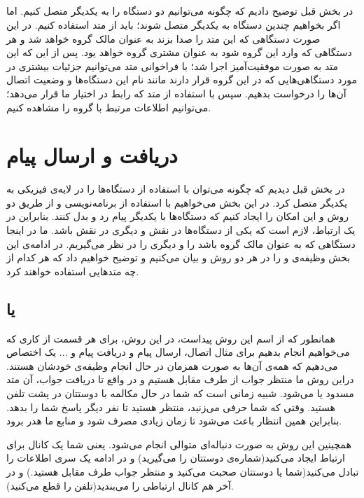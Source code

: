 \subsection{}
در بخش قبل توضیح دادیم که چگونه می‌توانیم دو دستگاه را به یکدیگر متصل کنیم. اما اگر بخواهیم چندین دستگاه به یکدیگر متصل شوند؛ باید از متد 
استفاده کنیم. در این صورت دستگاهی که این متد را صدا بزند به عنوان مالک گروه خواهد شد و هر دستگاهی که وارد این گروه شود به عنوان مشتری گروه خواهد یود. 
پس از این که این متد به صورت موفقیت‌آمیز اجرا شد؛ با فراخوانی متد
می‌توانیم جزئیات بیشتری در مورد دستگاهی‌هایی که در این گروه قرار دارند مانند نام این دستگاه‌ها و وضعیت اتصال آن‌ها را درخواست بدهیم. سپس با استفاده از متد
که رابط 
در اختیار ما قرار می‌دهد؛ می‌توانیم اطلاعات مرتبط با گروه را مشاهده کنیم.
\section{دریافت و ارسال پیام}
در بخش قبل دیدیم که چگونه می‌توان با استفاده از 
دستگاه‌ها را در لایه‌ی فیزیکی به یکدیگر متصل کرد. در این بخش می‌خواهیم با استفاده از برنامه‌نویسی 
 و از طریق دو روش 
و 
این امکان را ایجاد کنیم که دستگاه‌ها با یکدیگر پیام رد و بدل کنند. بنابراین در یک ارتباط، لازم است که یکی از دستگاه‌ها در نقش
 و دیگری در نقش
 باشد. ما در اینجا دستگاهی که به عنوان مالک گروه باشد را 
و  دیگری را 
 در نظر می‌گیریم. در ادامه‌ی این بخش وظیفه‌ی 
و
را در هر دو روش
و 
بیان می‌کنیم و توضیح خواهیم داد که هر کدام از چه متد‌هایی استفاده خواهند کرد.
\subsection{ یا }
همانطور که از اسم این روش پیداست، در این روش، برای هر قسمت از  کاری که می‌خواهیم انجام بدهیم برای مثال اتصال، ارسال پیام و دریافت پیام و ... یک 
اختصاص می‌دهیم که همه‌ی آن‌ها به صورت همزمان در حال انجام وظیفه‌ی خودشان هستند. 
دراین روش  ما منتظر جواب از طرف مقابل هستیم و در واقع تا دریافت جواب، آن متد مسدود یا 
می‌شود. شبیه زمانی است که شما در حال مکالمه با دوستتان در پشت تلفن هستید. وقتی که شما حرفی می‌زنید، منتظر هستید تا نفر دیگر پاسخ شما را بدهد. بنابراین همین انتظار باعث می‌شود تا زمان زیادی مصرف شود و منابع ما هدر برود.

همچینین این روش به صورت دنباله‌ای متوالی انجام می‌شود. یعنی شما یک کانال برای ارتباط ایجاد می‌کنید(شماره‌ی دوستتان را می‌گیرید) و در ادامه یک سری اطلاعات را تبادل می‌کنید(شما یا دوستتان صحبت می‌کنید و منتظر جواب طرف مقابل هستید.) و در آخر هم کانال ارتباطی را می‌بندید(تلفن را قطع می‌کنید).

